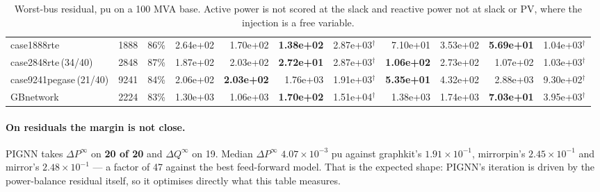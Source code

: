 \documentclass[10pt]{article}
\begin{document}
\begin{landscape}
\begin{table}[H]
\begin{tabular}{lrr rrrr rrrr}
case1888rte & 1888 & 86\% & 2.64e+02 & 1.70e+02 & \textbf{1.38e+02} & 2.87e+03$^\dagger$ & 7.10e+01 & 3.53e+02 & \textbf{5.69e+01} & 1.04e+03$^\dagger$ \\
case2848rte\,(34/40) & 2848 & 87\% & 1.87e+02 & 2.03e+02 & \textbf{2.72e+01} & 2.87e+03$^\dagger$ & \textbf{1.06e+02} & 2.73e+02 & 1.07e+02 & 1.03e+03$^\dagger$ \\
case9241pegase\,(21/40) & 9241 & 84\% & 2.06e+02 & \textbf{2.03e+02} & 1.76e+03 & 1.91e+03$^\dagger$ & \textbf{5.35e+01} & 4.32e+02 & 2.88e+03 & 9.30e+02$^\dagger$ \\
GBnetwork & 2224 & 83\% & 1.30e+03 & 1.06e+03 & \textbf{1.70e+02} & 1.51e+04$^\dagger$ & 1.38e+03 & 1.74e+03 & \textbf{7.03e+01} & 3.95e+03$^\dagger$ \\
\bottomrule
\end{tabular}
\caption{Worst-bus residual, pu on a 100 MVA base. Active power is not scored at the slack and reactive power not at slack or PV, where the injection is a free variable.}
\end{table}
\end{landscape}

\paragraph{On residuals the margin is not close.} PIGNN takes
$\Delta P^{\infty}$ on \textbf{20 of 20} and $\Delta Q^{\infty}$ on 19. Median
$\Delta P^{\infty}$ $4.07\times10^{-3}$ pu against graphkit's
$1.91\times10^{-1}$, mirrorpin's $2.45\times10^{-1}$ and mirror's
$2.48\times10^{-1}$ --- a factor of 47 against the best feed-forward model. That
is the expected shape: PIGNN's iteration is driven by the power-balance residual
itself, so it optimises directly what this table measures.
\end{document}
